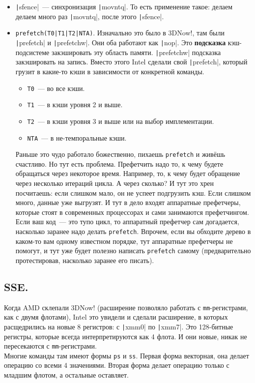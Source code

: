 \documentclass{article}
\begin{document}
\begin{itemize}
        \item \texttt|sfence|~--- синхронизация \texttt|movntq|. То есть применение такое: делаем делаем много раз \texttt|movntq|, после этого \texttt|sfence|.
        \item \Verb/prefetch(T0|T1|T2|NTA)/. Изначально это было в 3DNow!, там были \texttt|prefetch| и \texttt|prefetchw|. Они оба работают как \texttt|nop|. Это \textbf{подсказка} кэш-подсистеме закэшировать эту область памяти. \texttt|prefetchw| подсказка закэшировать на запись. Вместо этого Intel сделали свой \texttt|prefetch|, который грузит в какие-то кэши в зависимости от конкретной команды.
        \begin{itemize}
            \item \Verb|T0|~--- во все кэши.
            \item \Verb|T1|~--- в кэши уровня 2 и выше.
            \item \Verb|T2|~--- в кэши уровня 3 и выше или на выбор имплементации.
            \item \Verb|NTA|~--- в не-темпоральные кэши.
        \end{itemize}
        Раньше это чудо работало божественно, пихаешь \Verb|prefetch| и живёшь счастливо. Но тут есть проблема. Префетчить надо то, к чему будете обращаться через некоторое время. Например, то, к чему будет обращение через несколько итераций цикла. А через сколько? И тут это хрен посчитаешь: если слишком мало, он не успеет подгрузить кэш. Если слишком много, данные уже выгрузят. И тут в дело входят аппаратные префетчеры, которые стоят в современных процессорах и сами занимаются префетчингом. Если ваш код~--- это тупо цикл, то аппаратный префетчер сам догадается, насколько заранее надо делать \Verb|prefetch|. Впрочем, если вы обходите дерево в каком-то вам одному известном порядке, тут аппаратные префетчеры не помогут, и тут уже будет полезно написать \Verb|prefetch| самому (предварительно протестировав, насколько заранее его писать).
    \end{itemize}
    \subsection{SSE.}
    Когда AMD склепали 3DNow! (расширение позволяло работать с \Verb|mm|-регистрами, как с двумя флотами), Intel это увидели и сделали расширение, в которых расщедрились на новые 8 регистров: с \texttt|xmm0| по \texttt|xmm7|. Это 128-битные регистры, которые всегда интерпретируются как 4 флота. И они новые, никак не пересекаются с \Verb|mm|-регистрами.\\
    Многие команды там имеют формы \Verb|ps| и \Verb|ss|. Первая форма векторная, она делает операцию со всеми 4 значениями. Вторая форма делает операцию только с младшим флотом, а остальные оставляет.
\end{document}
